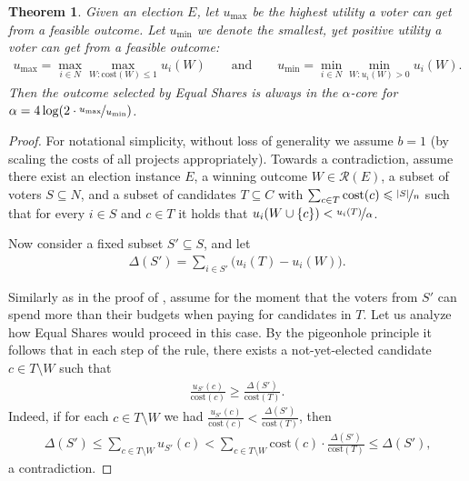 \documentclass[10pt]{scrartcl}
\renewcommand*{\leq}{\leqslant}
\renewcommand*{\geq}{\geqslant}
\newcommand{\cost}{{{\mathrm{cost}}}}
\newcommand{\calR}{{{\mathcal{R}}}}
\theoremstyle{definition}
\theoremstyle{plain}
\newtheorem{theorem}{Theorem}
\begin{document}
\begin{theorem}\label{thm:rule_x_and_core_general_model}
	Given an election $E$, let $u_{\max}$ be the highest utility a voter can get from a feasible outcome. Let $u_{\min}$ we denote the smallest, yet positive utility a voter can get from a feasible outcome:
	\begin{align*}
		u_{\max} = \max_{i \in N} \max_{W:\cost(W) \leq 1} u_i(W) \qquad \text{and} \qquad u_{\min} = \min_{i \in N} \min_{W:u_i(W) > 0} u_i(W) \text{.}
	\end{align*}
	Then the outcome selected by Equal Shares is always in the $\alpha$-core for $\alpha = 4\log(2\cdot \nicefrac{u_{\max}}{u_{\min}})$.
\end{theorem}
\begin{proof}
For notational simplicity, without loss of generality we assume $b = 1$ (by scaling the costs of all projects appropriately).
Towards a contradiction, assume there exist an election instance $E$, a winning outcome $W \in \calR(E)$, a subset of voters $S \subseteq N$, and a subset of candidates $T \subseteq C$ with $\sum_{c \in T}\cost(c) \leq \nicefrac{|S|}{n}$ such that for every $i \in S$ and $c \in T$ it holds that $u_i(W \cup \{c\}) < \nicefrac{u_i(T)}{\alpha}$.

Now consider a fixed subset $S' \subseteq S$, and let
\begin{align*}
	\Delta(S') = \sum_{i \in S'} \big(u_i(T) - u_i(W)\big).
\end{align*}

Similarly as in the proof of , assume for the moment that the voters from $S'$ can spend more than their budgets when paying for candidates in $T$. Let us analyze how Equal Shares would proceed in this case. By the pigeonhole principle it follows that in each step of the rule, there exists a not-yet-elected candidate $c \in T \setminus W$ such that
\begin{align*}
	\frac{u_{S'}(c)}{\cost(c)} \geq \frac{\Delta(S')}{\cost(T)} \text{.}
\end{align*}
Indeed, if for each $c \in T \setminus W$ we had $\frac{u_{S'}(c)}{\cost(c)} < \frac{\Delta(S')}{\cost(T)}$, then
\begin{align*}
	\Delta(S') \leq \sum_{c \in T \setminus W} u_{S'}(c) < \sum_{c \in T \setminus W} \cost(c) \cdot \frac{\Delta(S')}{\cost(T)} \leq \Delta(S') \text{,}
\end{align*}
a contradiction.


\end{proof}
\end{document}
